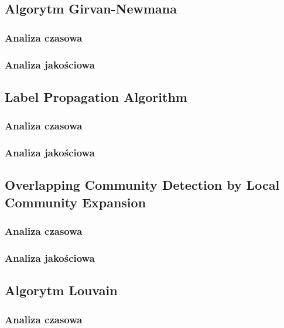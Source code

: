 \documentclass{article}
\begin{document}
\subsection{Algorytm Girvan-Newmana}
\subsubsection{Analiza czasowa}
\subsubsection{Analiza jakościowa}

\subsection{Label Propagation Algorithm}
\subsubsection{Analiza czasowa}
\subsubsection{Analiza jakościowa}

\subsection{Overlapping Community Detection by Local Community Expansion}
\subsubsection{Analiza czasowa}
\subsubsection{Analiza jakościowa}

\subsection{Algorytm Louvain}
\subsubsection{Analiza czasowa}
\end{document}
